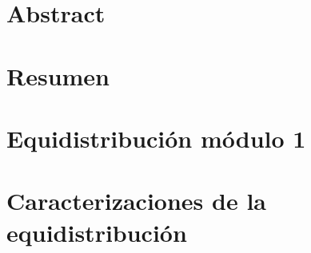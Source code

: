 \documentclass[a4paper,12pt,oneside]{book}
\begin{document}
\chapter*{Abstract}

\chapter*{Resumen}



\renewcommand{\baselinestretch}{0.1}\normalsize
\tableofcontents
\renewcommand{\baselinestretch}{0.3}\normalsize
\listoffigures
\renewcommand{\baselinestretch}{0.3}\normalsize
\renewcommand{\baselinestretch}{1.2}\normalsize





\newcommand{\gu}[1]{{\color{ggcol}{[G: #1]}}}
\newcommand{\bl}[1]{{\color{blue}#1}}
\newcommand{\gr}[1]{{\color{green}#1}}




\mainmatter %
\pagestyle{headings}

\def\tablename{Tabla}%


\chapter{Equidistribución módulo 1}


\chapter{Caracterizaciones de la equidistribución}

\end{document}
